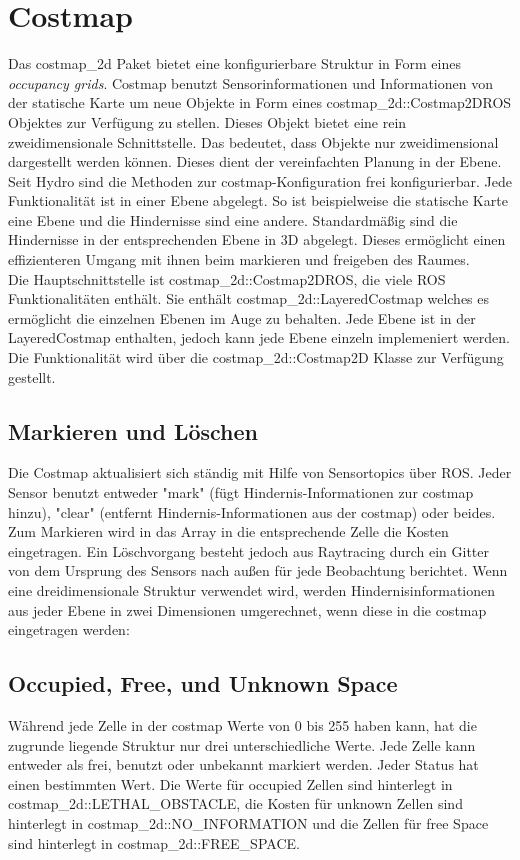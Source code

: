 \documentclass[oribibl]{llncs}
\begin{document}
\section{Costmap} \label{costmap}
Das costmap\_2d Paket \cite{costmap2d} bietet eine konfigurierbare Struktur in Form eines \textit{occupancy grids}. Costmap benutzt Sensorinformationen und Informationen von der statische Karte um neue Objekte in Form eines costmap\_2d::Costmap2DROS Objektes zur Verfügung zu stellen. Dieses Objekt bietet eine rein zweidimensionale Schnittstelle. Das bedeutet, dass Objekte nur zweidimensional dargestellt werden können. Dieses dient der vereinfachten Planung in der Ebene.\\
Seit Hydro sind die Methoden zur costmap-Konfiguration frei konfigurierbar. Jede Funktionalität ist in einer Ebene abgelegt. So ist beispielweise die statische Karte eine Ebene und die Hindernisse sind eine andere. Standardmäßig sind die Hindernisse in der entsprechenden Ebene in 3D abgelegt. Dieses ermöglicht einen effizienteren Umgang mit ihnen beim markieren und freigeben des Raumes.\\
Die Hauptschnittstelle ist costmap\_2d::Costmap2DROS, die viele ROS Funktionalitäten enthält. Sie enthält costmap\_2d::LayeredCostmap welches es ermöglicht die einzelnen Ebenen im Auge zu behalten. Jede Ebene ist in der LayeredCostmap enthalten, jedoch kann jede Ebene einzeln implemeniert werden. Die Funktionalität wird über die costmap\_2d::Costmap2D Klasse zur Verfügung gestellt.
\subsection{Markieren und Löschen}
Die Costmap aktualisiert sich ständig mit Hilfe von Sensortopics über ROS. Jeder Sensor benutzt entweder "mark" (fügt Hindernis-Informationen zur costmap  hinzu), "clear" (entfernt Hindernis-Informationen aus der costmap) oder beides. Zum Markieren wird in das Array in die entsprechende Zelle die Kosten eingetragen. Ein Löschvorgang besteht jedoch aus Raytracing durch ein Gitter von dem Ursprung des Sensors nach außen für jede Beobachtung berichtet. Wenn eine dreidimensionale Struktur verwendet wird, werden Hindernisinformationen aus jeder Ebene in zwei Dimensionen umgerechnet, wenn diese in die costmap eingetragen werden:\\
\subsection{Occupied, Free, und Unknown Space}
Während jede Zelle in der costmap Werte von 0 bis 255 haben kann, hat die zugrunde liegende Struktur nur drei unterschiedliche Werte. Jede Zelle kann entweder als frei, benutzt oder unbekannt markiert werden. Jeder Status hat einen bestimmten Wert. Die Werte für occupied Zellen sind hinterlegt in costmap\_2d::LETHAL\_OBSTACLE, die Kosten für unknown Zellen sind hinterlegt in costmap\_2d::NO\_INFORMATION und die Zellen für free Space sind hinterlegt in costmap\_2d::FREE\_SPACE.
\end{document}
